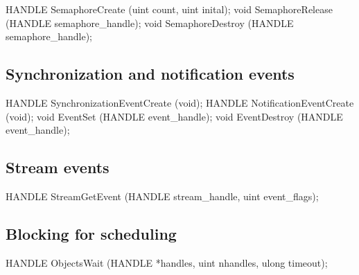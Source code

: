 \begin{paldef}
HANDLE SemaphoreCreate (uint count, uint inital);
void SemaphoreRelease (HANDLE semaphore_handle);
void SemaphoreDestroy (HANDLE semaphore_handle);
\end{paldef}




\subsection*{Synchronization and notification events}

\begin{paldef}
HANDLE SynchronizationEventCreate (void);
HANDLE NotificationEventCreate (void);
void EventSet (HANDLE event_handle);
void EventDestroy (HANDLE event_handle);
\end{paldef}



\subsection*{Stream events}

\begin{paldef}
HANDLE StreamGetEvent (HANDLE stream_handle, uint event_flags);
\end{paldef}



\subsection*{Blocking for scheduling}

\begin{paldef}
HANDLE ObjectsWait (HANDLE *handles, uint nhandles,
                    ulong timeout);
\end{paldef}

